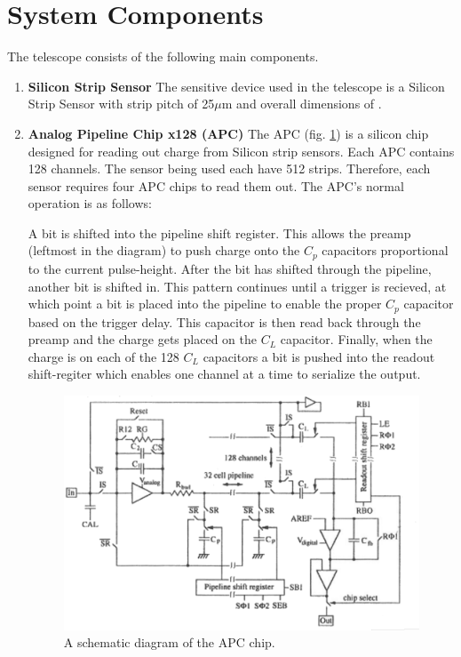 \documentclass{article}
\newcommand{\itemt}[1]{\item \textbf{#1}}
\newcommand{\um}{$\mu$m}
\begin{document}
\section{System Components}
The telescope consists of the following main components.
\begin{enumerate}
  \itemt{Silicon Strip Sensor}
    The sensitive device used in the telescope is a Silicon Strip Sensor with strip pitch of \unit{25}{\um} and overall dimensions of . 
  \itemt{Analog Pipeline Chip x128 (\gls{APC})}
    The \gls{APC} (fig. \ref{fig:APC128_Schematic}) is a silicon chip designed for reading out charge from Silicon strip sensors. Each \gls{APC} contains 128 channels. The sensor being used each have 512 strips. Therefore, each sensor requires four \gls{APC} chips to read them out. The \gls{APC}'s normal operation is as follows:

    A bit is shifted into the pipeline shift register. This allows the preamp (leftmost in the diagram) to push charge onto the $C_p$ capacitors proportional to the current pulse-height. After the bit has shifted through the pipeline, another bit is shifted in. This pattern continues until a trigger is recieved, at which point a bit is placed into the pipeline to enable the proper $C_p$ capacitor based on the trigger delay. This capacitor is then read back through the preamp and the charge gets placed on the $C_L$ capacitor. Finally, when the charge is on each of the 128 $C_L$ capacitors a bit is pushed into the readout shift-regiter which enables one channel at a time to serialize the output.

    \begin{figure}[h]
      \centering
      \includegraphics{./figures/APC128_Schematic.png}
      \caption{A schematic diagram of the \gls{APC} chip.}
      \label{fig:APC128_Schematic}
    \end{figure}


\end{enumerate}
\end{document}
